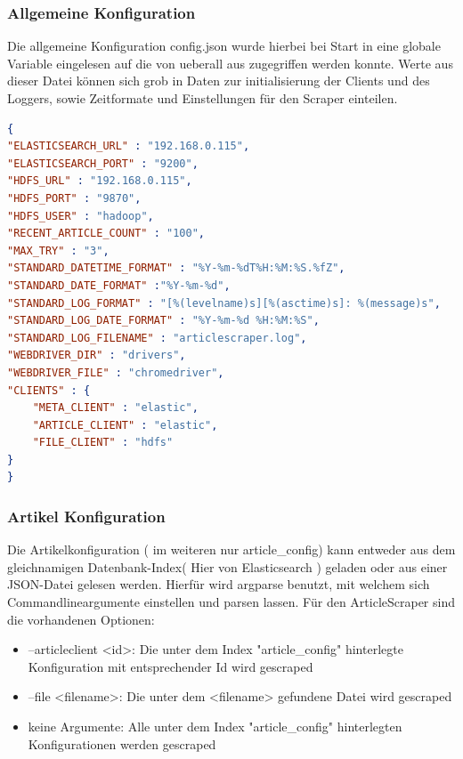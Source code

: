 \documentclass[12pt,oneside,a4paper,parskip]{scrbook}
\begin{document}
\subsubsection{Allgemeine Konfiguration}
Die allgemeine Konfiguration config.json wurde hierbei bei Start in eine globale Variable eingelesen auf die von ueberall aus zugegriffen werden konnte. Werte aus dieser Datei können sich grob in Daten zur initialisierung der Clients und des Loggers, sowie Zeitformate und Einstellungen für den Scraper einteilen.
\begin{lstlisting}[caption=config.json,label=config,language=json]
{
"ELASTICSEARCH_URL" : "192.168.0.115",
"ELASTICSEARCH_PORT" : "9200",
"HDFS_URL" : "192.168.0.115",
"HDFS_PORT" : "9870",
"HDFS_USER" : "hadoop",
"RECENT_ARTICLE_COUNT" : "100",
"MAX_TRY" : "3",
"STANDARD_DATETIME_FORMAT" : "%Y-%m-%dT%H:%M:%S.%fZ",
"STANDARD_DATE_FORMAT" :"%Y-%m-%d",
"STANDARD_LOG_FORMAT" : "[%(levelname)s][%(asctime)s]: %(message)s",
"STANDARD_LOG_DATE_FORMAT" : "%Y-%m-%d %H:%M:%S",
"STANDARD_LOG_FILENAME" : "articlescraper.log",
"WEBDRIVER_DIR" : "drivers",
"WEBDRIVER_FILE" : "chromedriver",
"CLIENTS" : {
    "META_CLIENT" : "elastic",
    "ARTICLE_CLIENT" : "elastic",
    "FILE_CLIENT" : "hdfs"
}
}
\end{lstlisting}
\subsubsection{Artikel Konfiguration}
Die Artikelkonfiguration ( im weiteren nur article\_config) kann entweder aus dem gleichnamigen Datenbank-Index( Hier von  Elasticsearch ) geladen oder aus einer JSON-Datei gelesen werden. Hierfür wird argparse benutzt, mit welchem sich Commandlineargumente einstellen und parsen lassen. Für den ArticleScraper sind die vorhandenen Optionen:
\begin{itemize}
\item --articleclient <id>: Die unter dem Index "article\_config" hinterlegte Konfiguration mit entsprechender Id wird gescraped
\item --file <filename>: Die unter dem <filename> gefundene Datei wird gescraped
\item keine Argumente: Alle unter dem Index "article\_config" hinterlegten Konfigurationen werden gescraped
\end{itemize}
\end{document}
